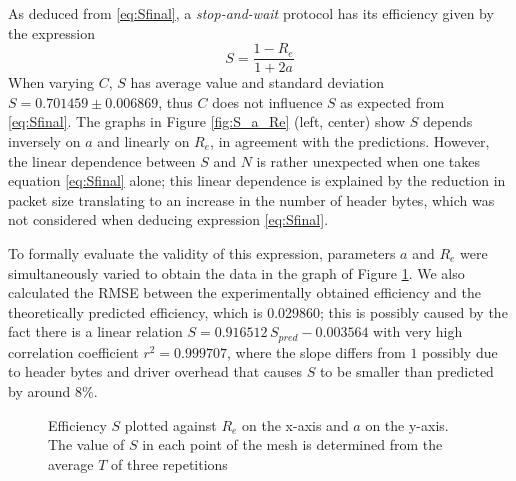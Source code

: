 \documentclass[a4paper, 11pt]{report}
\begin{document}
As deduced from \ref{eq:Sfinal}, a \textit{stop-and-wait} protocol has its efficiency given by the expression
\begin{equation*}
	S = \frac{1-R_e}{1 + 2a}
\end{equation*}
When varying $C$, $S$ has average value and standard deviation $S=0.701459\pm0.006869$, thus $C$ does not influence $S$ as expected from \ref{eq:Sfinal}. The graphs in Figure \ref{fig:S_a_Re} (left, center) show $S$ depends inversely on $a$ and linearly on $R_e$, in agreement with the predictions. However, the linear dependence between $S$ and $N$ is rather unexpected when one takes equation \ref{eq:Sfinal} alone; this linear dependence is explained by the reduction in packet size translating to an increase in the number of header bytes, which was not considered when deducing expression \ref{eq:Sfinal}.

To formally evaluate the validity of this expression, parameters $a$ and $R_e$ were simultaneously varied to obtain the data in the graph of Figure \ref{fig:S_aRe}. We also calculated the RMSE between the experimentally obtained efficiency and the theoretically predicted efficiency, which is 0.029860; this is possibly caused by the fact there is a linear relation $S=0.916512\,S_{pred} - 0.003564$ with very high correlation coefficient $r^2 = 0.999707$, where the slope differs from $1$ possibly due to header bytes and driver overhead that causes $S$ to be smaller than predicted by around $8\%$.

\begin{figure}[H]
	\begin{center}
	  	\caption{Efficiency $S$ plotted against $R_e$ on the x-axis and $a$ on the y-axis. The value of $S$ in each point of the mesh is determined from the average $T$ of three repetitions} \label{fig:S_aRe}
	\end{center}
\end{figure}
\end{document}
